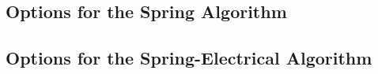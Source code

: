 \subsection{Options for the Spring Algorithm}

\subsection{Options for the Spring-Electrical Algorithm}


